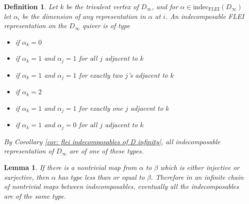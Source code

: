 \documentclass{article}
\newtheorem{lemma}{Lemma}[section]
\newtheorem{definition}{Definition}
\begin{document}
\begin{definition}
  Let $k$ be the trivalent vertex of $D_\infty$, and for $\alpha \in \text{indec}_\text{FLEI}(D_\infty)$ let $\alpha_i$ be the dimension of any representation in $\alpha$ at $i$. An indecomposable FLEI representation on the $D_\infty$ quiver is of \emph{type}
  \begin{itemize}
  \item[I] if $\alpha_k=0$
  \item[II] if $\alpha_k=1$ and $\alpha_j=1$ for all $j$ adjacent to $k$
  \item[III (a)] if $\alpha_k=1$ and $\alpha_j=1$ for exactly two $j$'s adjacent to $k$
  \item[III (b)] if $\alpha_k=2$
  \item[IV] if $\alpha_k=1$ and $\alpha_j=1$ for exactly one $j$ adjacent to $k$
  \item[V] if $\alpha_k=1$ and $\alpha_j=0$ for all $j$ adjacent to $k$
  \end{itemize}
  By Corollary \ref{cor: flei indecomposables of D infinity}, all indecomposable representation of $D_\infty$ are of one of these types.  
\end{definition}



\begin{lemma}\label{lm: ordering among types}
    If there is a nontrivial map from $\alpha$ to $\beta$ which is either injective or surjective, then $\alpha$ has type less than or equal to $\beta$. Therefore in an infinite chain of nontrivial maps between indecomposables, eventually all the indecomposables are of the same type.  
\end{lemma}
\end{document}
